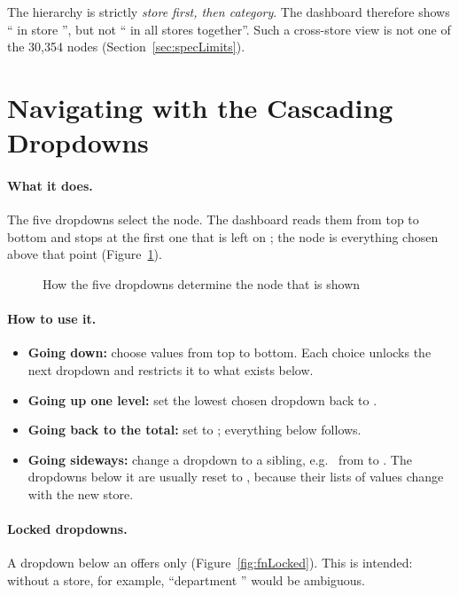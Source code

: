 \begin{NoteBox}
The hierarchy is strictly \emph{store first, then category}. The dashboard therefore shows `` in store '', but not `` in all stores together''. Such a cross-store view is not one of the 30,354 nodes (Section~\ref{sec:specLimits}).
\end{NoteBox}

\section{Navigating with the Cascading Dropdowns}
\label{sec:fnNavigate}

\paragraph{What it does.} The five dropdowns  select the node. The dashboard reads them from top to bottom and stops at the first one that is left on ; the node is everything chosen above that point (Figure~\ref{fig:cascadeLogic}).

\begin{figure}[H]
  \centering
  
  \caption{How the five dropdowns determine the node that is shown}
  \label{fig:cascadeLogic}
\end{figure}

\paragraph{How to use it.}
\begin{itemize}
  \item \textbf{Going down:} choose values from top to bottom. Each choice unlocks the next dropdown and restricts it to what exists below.
  \item \textbf{Going up one level:} set the lowest chosen dropdown back to .
  \item \textbf{Going back to the total:} set  to ; everything below follows.
  \item \textbf{Going sideways:} change a dropdown to a sibling, e.g.\  from  to . The dropdowns below it are usually reset to , because their lists of values change with the new store.
\end{itemize}

\paragraph{Locked dropdowns.} A dropdown below an  offers only  (Figure~\ref{fig:fnLocked}). This is intended: without a store, for example, ``department '' would be ambiguous.

